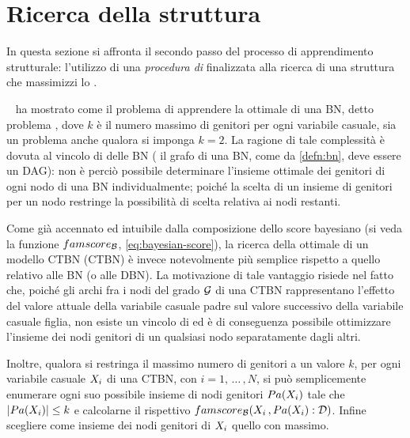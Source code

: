 \section{Ricerca della struttura}\label{sec:structurallearning-search}
In questa sezione si affronta il secondo passo del processo di apprendimento strutturale: l'utilizzo di una \emph{procedura di } finalizzata alla ricerca di una struttura che massimizzi lo \emph{}.

~\citet{Chickering1994} ha mostrato come il problema di apprendere la  ottimale di una \acl{BN}, detto problema \emph{}, dove $k$ è il numero massimo di genitori per ogni variabile casuale, sia un problema \emph{} anche qualora si imponga $k=2$. La ragione di tale complessità è dovuta al vincolo di  delle \acs{BN} (\ie{} il grafo di una \acs{BN}, come da \autoref{defn:bn}, deve essere un \acs{DAG}): non è perciò possibile determinare l'insieme ottimale dei genitori di ogni nodo di una \acs{BN} individualmente; poiché la scelta di un insieme di genitori per un nodo restringe la possibilità di scelta relativa ai nodi restanti.

Come già accennato ed intuibile dalla composizione dello score bayesiano (si veda la funzione $famscore_{\mathcal{B}}$, \autoref{eq:bayesian-score}), la ricerca della  ottimale di un modello \acl{CTBN} (\acs{CTBN}) è invece notevolmente più semplice rispetto a quello relativo alle \acs{BN} (o alle \acs{DBN}). La motivazione di tale vantaggio risiede nel fatto che, poiché gli archi fra i nodi del grado $\mathcal{G}$ di una \acs{CTBN} rappresentano l'effetto del valore attuale della variabile casuale padre sul valore successivo della variabile casuale figlia, non esiste un vincolo di  ed è di conseguenza possibile ottimizzare l'insieme dei nodi genitori di un qualsiasi nodo separatamente dagli altri.

Inoltre, qualora si restringa il massimo numero di genitori a un valore $k$, per ogni variabile casuale $\mathnormal{X}_i$ di una \acs{CTBN}, con $i=1,\,\dotsc\,,N$, si può semplicemente enumerare ogni suo possibile insieme di nodi genitori $Pa(\mathnormal{X}_i)$ tale che $\arrowvert Pa(\mathnormal{X}_i) \arrowvert \leq k$ e calcolarne il rispettivo  $famscore_{\mathcal{B}}(\mathnormal{X}_i\,,Pa(\mathnormal{X}_i):\mathcal{D})$. Infine scegliere come insieme dei nodi genitori di $\mathnormal{X}_i$ quello con  massimo.


